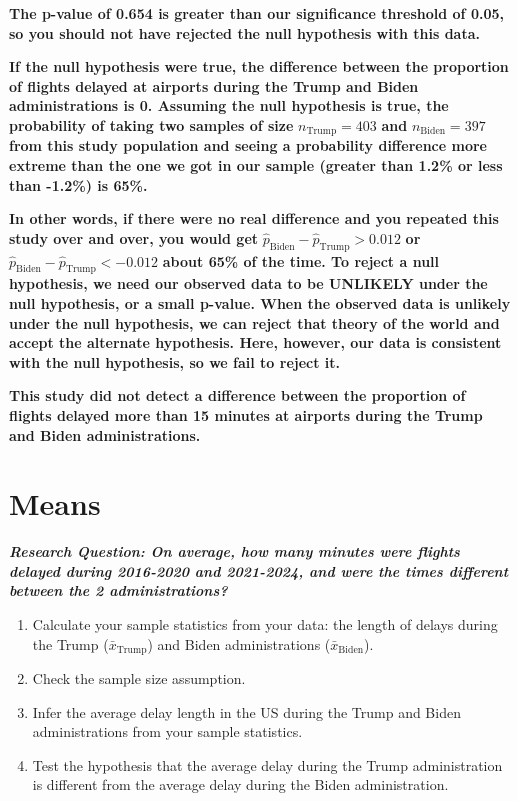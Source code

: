 \documentclass[
  letterpaper,
  DIV=11,
  numbers=noendperiod]{scrartcl}
\begin{document}
\begin{tcolorbox}[enhanced jigsaw, toprule=.15mm, breakable, leftrule=.75mm, bottomrule=.15mm, rightrule=.15mm, colback=white, opacityback=0, colframe=quarto-callout-warning-color-frame, left=2mm, arc=.35mm]

\textbf{The p-value of 0.654 is greater than our significance threshold
of 0.05, so you should not have rejected the null hypothesis with this
data.}

\textbf{If the null hypothesis were true, the difference between the
proportion of flights delayed at airports during the Trump and Biden
administrations is 0. Assuming the null hypothesis is true, the
probability of taking two samples of size} \(n_{\text{Trump}}=403\)
\textbf{and} \(n_{\text{Biden}}=397\) \textbf{from this study population
and seeing a probability difference more extreme than the one we got in
our sample (greater than 1.2\% or less than -1.2\%) is 65\%.}

\textbf{In other words, if there were no real difference and you
repeated this study over and over, you would get}
\(\hat{p}_{\text{Biden}}-\hat{p}_{\text{Trump}}>0.012\) \textbf{or}
\(\hat{p}_{\text{Biden}}-\hat{p}_{\text{Trump}}<-0.012\) \textbf{about
65\% of the time. To reject a null hypothesis, we need our observed data
to be UNLIKELY under the null hypothesis, or a small p-value. When the
observed data is unlikely under the null hypothesis, we can reject that
theory of the world and accept the alternate hypothesis. Here, however,
our data is consistent with the null hypothesis, so we fail to reject
it.}

\textbf{This study did not detect a difference between the proportion of
flights delayed more than 15 minutes at airports during the Trump and
Biden administrations.}

\end{tcolorbox}

\section{Means}\label{means}

\textbf{\emph{Research Question: On average, how many minutes were
flights delayed during 2016-2020 and 2021-2024, and were the times
different between the 2 administrations?}}

\begin{enumerate}
\def\labelenumi{\arabic{enumi}.}
\item
  Calculate your sample statistics from your data: the length of delays
  during the Trump (\(\bar{x}_{\text{Trump}}\)) and Biden
  administrations (\(\bar{x}_{\text{Biden}}\)).
\item
  Check the sample size assumption.
\item
  Infer the average delay length in the US during the Trump and Biden
  administrations from your sample statistics.
\item
  Test the hypothesis that the average delay during the Trump
  administration is different from the average delay during the Biden
  administration.
\end{enumerate}
\end{document}

